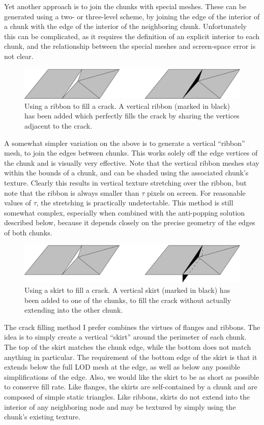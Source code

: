 \documentclass[12pt]{article}
\begin{document}
Yet another approach is to join the chunks with special meshes.  These
can be generated using a two- or three-level scheme, by joining the
edge of the interior of a chunk with the edge of the interior of the
neighboring chunk.  Unfortunately this can be complicated, as it
requires the definition of an explicit interior to each chunk, and the
relationship between the special meshes and screen-space error is not
clear.
 
\begin{figure}[h]
\centering
\includegraphics[width=6in]{sig-fig-ribbon}
\caption{Using a ribbon to fill a crack.  A vertical ribbon (marked in
black) has been added which perfectly fills the crack by sharing the
vertices adjacent to the crack.}
\label{fig:ribbon}
\end{figure}

A somewhat simpler variation on the above is to generate a vertical
``ribbon'' mesh, to join the edges between chunks.  This works solely
off the edge vertices of the chunk and is visually very effective.
Note that the vertical ribbon meshes stay within the bounds of a
chunk, and can be shaded using the associated chunk's texture.
Clearly this results in vertical texture stretching over the ribbon,
but note that the ribbon is always smaller than $\tau$ pixels on
screen.  For reasonable values of $\tau$, the stretching is
practically undetectable.  This method is still somewhat complex,
especially when combined with the anti-popping solution described
below, because it depends closely on the precise geometry of the edges
of both chunks.

\begin{figure}[h]
\centering
\includegraphics[width=6in]{sig-fig-skirt}
\caption{ Using a skirt to fill a crack.  A vertical skirt (marked in
black) has been added to one of the chunks, to fill the crack without
actually extending into the other chunk.  }
\label{fig:skirt}
\end{figure}

The crack filling method I prefer combines the virtues of flanges and
ribbons.  The idea is to simply create a vertical ``skirt'' around the
perimeter of each chunk.  The top of the skirt matches the chunk edge,
while the bottom does not match anything in particular.  The
requirement of the bottom edge of the skirt is that it extends below
the full LOD mesh at the edge, as well as below any possible
simplifications of the edge.  Also, we would like the skirt to be as
short as possible to conserve fill rate.  Like flanges, the skirts are
self-contained by a chunk and are composed of simple static
triangles. Like ribbons, skirts do not extend into the interior of any
neighboring node and may be textured by simply using the chunk's
existing texture.
\end{document}
